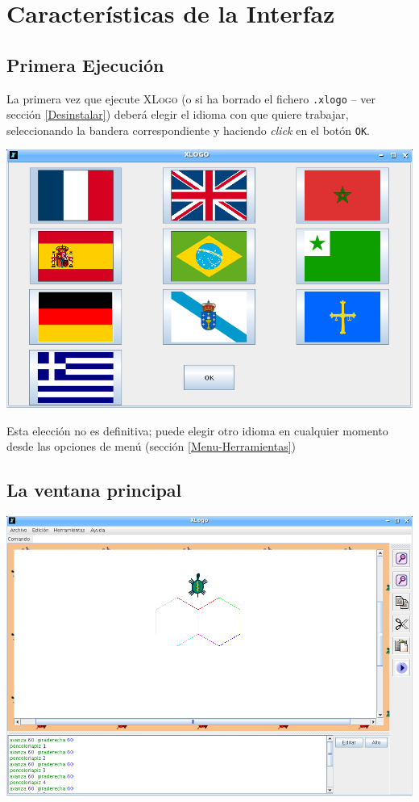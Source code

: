 \chapter{Caracter\'isticas de la Interfaz}
   \label{Caracteristicas_Interfaz}

\section{Primera Ejecuci\'on}
   \label{Primera_Ejecucion}

La primera vez que ejecute \textsc{XLogo} (o si ha borrado el fichero
\texttt{.xlogo} -- ver secci\'on \ref{Desinstalar}) deber\'a elegir
el idioma con que quiere trabajar, seleccionando la bandera correspondiente
y haciendo \textit{click} en el bot\'on \texttt{OK}.
\begin{center}
   \includegraphics[scale=0.2]{Imagenes/02_Caracteristicas/PantallaIdioma.png}
\end{center}
Esta elecci\'on no es definitiva; puede elegir otro idioma en cualquier
momento desde las opciones de men\'u (secci\'on \ref{Menu-Herramientas})

\section{La ventana principal}
   \label{La-ventana-principal}

\begin{center}
   \includegraphics[scale=0.35]{Imagenes/02_Caracteristicas/VentanaPcpal_090.png}
\end{center}


